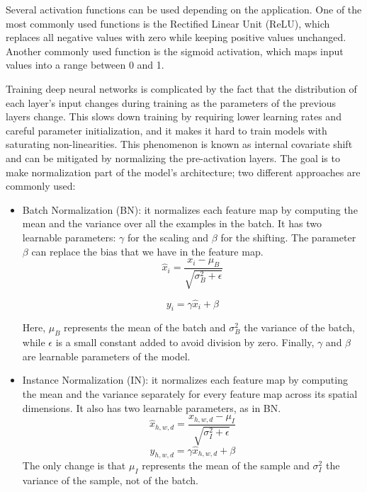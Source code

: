 \documentclass[12pt]{article}
\begin{document}
Several activation functions can be used depending on the application. 
One of the most commonly used functions is the Rectified Linear Unit (ReLU), which replaces all negative values with zero while keeping positive values unchanged. 
Another commonly used function is the sigmoid activation, which maps input values into a range between 0 and 1.
\vspace{0.5cm}

Training deep neural networks is complicated by the fact that the distribution of each layer's input changes during training as the parameters of the previous layers change.
This slows down training by requiring lower learning rates and careful parameter initialization, and it makes it hard to train models with saturating non-linearities.
This phenomenon is known as internal covariate shift and can be mitigated by normalizing the pre-activation layers.
The goal is to make normalization part of the model's architecture; two different approaches are commonly used:


\begin{itemize}
    \item Batch Normalization (BN): it normalizes each feature map by computing the mean and the variance over all the examples in the batch.
    It has two learnable parameters: $\gamma$ for the scaling and $\beta$ for the shifting.
    The parameter $\beta$ can replace the bias that we have in the feature map. %
    \[
    \hat{x}_i = \frac{x_i - \mu_B}{\sqrt{\sigma_B^2 + \epsilon}}
    \]


    \[
    y_i = \gamma \hat{x}_i + \beta
    \]


    Here, $\mu_B$ represents the mean of the batch and $\sigma_B^2$ the variance of the batch, while $\epsilon$ is a small constant added to avoid division by zero.
    Finally, $\gamma$ and $\beta$ are learnable parameters of the model.


    \item Instance Normalization (IN): it normalizes each feature map by computing the mean and the variance separately for every feature map across its spatial dimensions.
    It also has two learnable parameters, as in BN. %
    \[
    \hat{x}_{h,w,d} = \frac{x_{h,w,d} - \mu_I}{\sqrt{\sigma_I^2 + \epsilon}}
    \]
    \[
    y_{h,w,d} = \gamma \hat{x}_{h,w,d} + \beta
    \]
    The only change is that $\mu_I$ represents the mean of the sample and $\sigma_I^2$ the variance of the sample, not of the batch.


\end{itemize}
\end{document}
